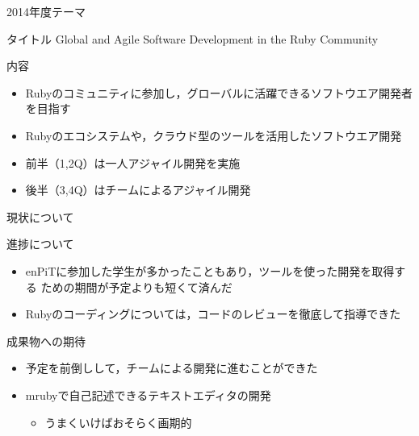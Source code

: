 \documentclass[t]{beamer}
\begin{document}
\begin{frame}[label=sec-7]{2014年度テーマ}
\begin{block}{タイトル}
Global and Agile Software Development in the Ruby Community
\end{block}

\begin{block}{内容}
\begin{itemize}
\item Rubyのコミュニティに参加し，グローバルに活躍できるソフトウエア開発者
を目指す
\item Rubyのエコシステムや，クラウド型のツールを活用したソフトウエア開発
\item 前半（1,2Q）は一人アジャイル開発を実施
\item 後半（3,4Q）はチームによるアジャイル開発
\end{itemize}
\end{block}
\end{frame}
\begin{frame}[label=sec-8]{現状について}
\begin{block}{進捗について}
\begin{itemize}
\item enPiTに参加した学生が多かったこともあり，ツールを使った開発を取得する
ための期間が予定よりも短くて済んだ
\item Rubyのコーディングについては，コードのレビューを徹底して指導できた
\end{itemize}
\end{block}

\begin{block}{成果物への期待}
\begin{itemize}
\item 予定を前倒しして，チームによる開発に進むことができた
\item mrubyで自己記述できるテキストエディタの開発
\begin{itemize}
\item うまくいけばおそらく画期的
\end{itemize}
\end{itemize}
\end{block}
\end{frame}
\end{document}
